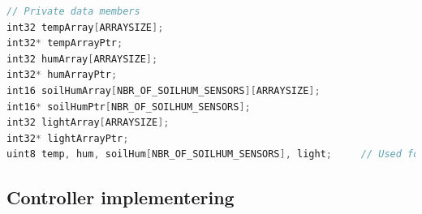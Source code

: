 \begin{lstlisting}[language=C, label=lst:DSP_decl, caption=Deklaration af arrays og pointers]
// Private data members
int32 tempArray[ARRAYSIZE];
int32* tempArrayPtr;
int32 humArray[ARRAYSIZE];
int32* humArrayPtr;
int16 soilHumArray[NBR_OF_SOILHUM_SENSORS][ARRAYSIZE];
int16* soilHumPtr[NBR_OF_SOILHUM_SENSORS];
int32 lightArray[ARRAYSIZE];
int32* lightArrayPtr;
uint8 temp, hum, soilHum[NBR_OF_SOILHUM_SENSORS], light;     // Used for storing the newest value
\end{lstlisting}



\subsection{Controller implementering}

